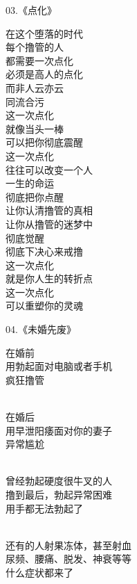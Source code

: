\begin{multicols}{2}
    \begin{center}
        03.《点化》\it

        在这个堕落的时代 \\ 每个撸管的人 \\ 都需要一次点化 \\ 必须是高人的点化 \\ 而非人云亦云 \\ 同流合污 \\ 这一次点化 \\ 就像当头一棒 \\ 可以把你彻底震醒 \\ 这一次点化 \\ 往往可以改变一个人 \\ 一生的命运 \\ 彻底把你点醒 \\ 让你认清撸管的真相 \\ 让你从撸管的迷梦中 \\ 彻底觉醒 \\ 彻底下决心来戒撸 \\ 这一次点化 \\ 就是你人生的转折点 \\ 这一次点化 \\ 可以重塑你的灵魂
    \end{center}

    \begin{center}
        04.《未婚先废》\it

        在婚前 \\ 用勃起面对电脑或者手机 \\ 疯狂撸管

        ~\\

        在婚后 \\ 用早泄阳痿面对你的妻子 \\ 异常尴尬

        ~\\

        曾经勃起硬度很牛叉的人 \\ 撸到最后，勃起异常困难 \\ 用手都无法勃起了

        ~\\

        还有的人射果冻体，甚至射血 \\ 尿频、腰痛、脱发、神衰等等 \\ 什么症状都来了

        ~\\


\end{center}
\end{multicols}
